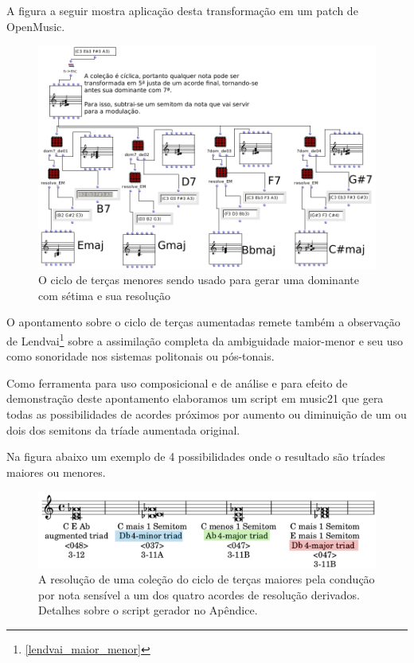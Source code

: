 \documentclass[
	12pt,				%
	openright,			%
	twoside,			%
	a4paper,			%
	english,			%
	french,				%
	spanish,			%
	brazil				%
	]{abntex2}
\begin{document}
\pagebreak
A figura a seguir mostra aplicação desta transformação em um patch de OpenMusic.


\begin{figure}[!h]
	\caption{\label{fig_grafico}O ciclo de terças menores sendo usado para gerar uma dominante com sétima e sua resolução   }
	\begin{center}
	    \includegraphics[scale=0.5]{ciclos/setimadominante.png}
	\end{center}
\end{figure}

O apontamento sobre o ciclo de terças aumentadas remete também a observação de Lendvai\footnote{ \autoref{lendvai_maior_menor} } sobre a assimilação completa da ambiguidade maior-menor e seu uso como sonoridade nos sistemas politonais ou pós-tonais. 

Como ferramenta para uso composicional e de análise e para efeito de demonstração deste apontamento elaboramos um script em music21 que gera todas as possibilidades de acordes próximos por aumento ou diminuição de um ou dois dos semitons da tríade aumentada original. 

Na figura abaixo um exemplo de 4 possibilidades onde o resultado são tríades maiores ou menores.

\begin{figure}[!h]
	\caption{\label{fig_grafico}A resolução de uma coleção do ciclo de terças maiores pela condução por nota sensível a um dos quatro acordes de resolução derivados. Detalhes sobre o script gerador no Apêndice.   }
	\begin{center}
	    \includegraphics[scale=0.3]{ciclos/transpoe_triades_aumentadas.png}
	\end{center}
\end{figure}
\pagebreak
\end{document}
